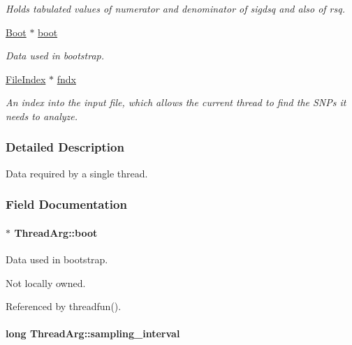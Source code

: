\begin{DoxyCompactItemize}
\begin{DoxyCompactList}\small\item\em \-Holds tabulated values of numerator and denominator of sigdsq and also of rsq. \end{DoxyCompactList}\item 
\hyperlink{struct_boot}{\-Boot} $\ast$ \hyperlink{struct_thread_arg_aab899376a7a5c492cec323d9e5728ac2}{boot}
\begin{DoxyCompactList}\small\item\em \-Data used in bootstrap. \end{DoxyCompactList}\item 
\hypertarget{struct_thread_arg_a28bf9b11f7f26d007a926ecce5d06e89}{\hyperlink{struct_file_index}{\-File\-Index} $\ast$ \hyperlink{struct_thread_arg_a28bf9b11f7f26d007a926ecce5d06e89}{fndx}}\label{struct_thread_arg_a28bf9b11f7f26d007a926ecce5d06e89}

\begin{DoxyCompactList}\small\item\em \-An index into the input file, which allows the current thread to find the \-S\-N\-Ps it needs to analyze. \end{DoxyCompactList}\end{DoxyCompactItemize}


\subsubsection{\-Detailed \-Description}
\-Data required by a single thread. 

\subsubsection{\-Field \-Documentation}
\hypertarget{struct_thread_arg_aab899376a7a5c492cec323d9e5728ac2}{
\paragraph[{boot}]{$\ast$ {\bf \-Thread\-Arg\-::boot}}}\label{struct_thread_arg_aab899376a7a5c492cec323d9e5728ac2}


\-Data used in bootstrap. 

\-Not locally owned. 

\-Referenced by threadfun().

\hypertarget{struct_thread_arg_ac82e3148f3f1efd2ad66f235afd1f5e5}{
\paragraph[{sampling\-\_\-interval}]{\setlength{\rightskip}{0pt plus 5cm}long {\bf \-Thread\-Arg\-::sampling\-\_\-interval}}}\label{struct_thread_arg_ac82e3148f3f1efd2ad66f235afd1f5e5}


